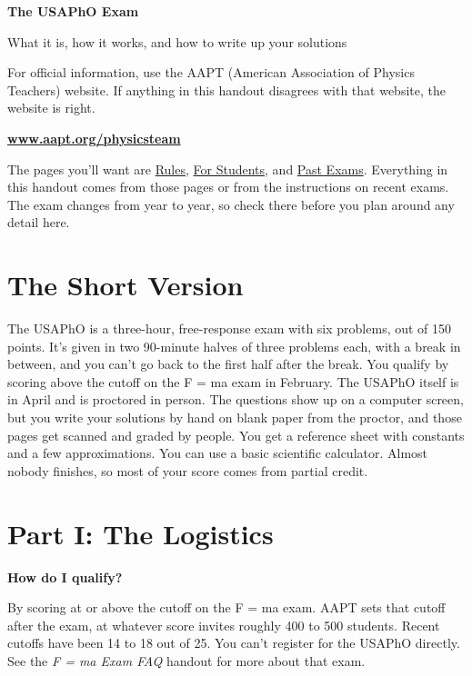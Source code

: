 \documentclass[11pt]{article}
\newcommand{\psettitle}[1]{
    \begin{center}
    \huge \textbf{#1}
    \end{center}
}
\newcommand{\Q}[1]{\par\medskip\noindent\textbf{\color{qblue}#1}\par\nobreak\vspace{1pt}\nobreak}
\begin{document}
\psettitle{The USAPhO Exam}
\begin{center}
\large What it is, how it works, and how to write up your solutions
\end{center}

\begin{official}
For official information, use the AAPT (American Association of Physics Teachers) website.
If anything in this handout disagrees with that website, the website is right.
\begin{center}
\large\bfseries
\href{https://www.aapt.org/physicsteam/}{www.aapt.org/physicsteam}
\end{center}
The pages you'll want are
\href{https://www.aapt.org/physicsteam/PT-rules.cfm}{Rules},
\href{https://www.aapt.org/physicsteam/PT-students.cfm}{For Students}, and
\href{https://www.aapt.org/Common2022/pastexams.cfm}{Past Exams}. Everything in this
handout comes from those pages or from the instructions on recent exams. The exam changes
from year to year, so check there before you plan around any detail here.
\end{official}

\section{The Short Version}

\begin{keybox}
The USAPhO is a three-hour, free-response exam with six problems, out of 150 points. It's
given in two 90-minute halves of three problems each, with a break in between, and you
can't go back to the first half after the break. You qualify by scoring above the cutoff on
the F = ma exam in February. The USAPhO itself is in April and is proctored in person. The
questions show up on a computer screen, but you write your solutions by hand on blank paper
from the proctor, and those pages get scanned and graded by people. You get a reference
sheet with constants and a few approximations. You can use a basic scientific calculator.
Almost nobody finishes, so most of your score comes from partial credit.
\end{keybox}

\section{Part I: The Logistics}

\Q{How do I qualify?}
By scoring at or above the cutoff on the F = ma exam. AAPT sets that cutoff after the exam,
at whatever score invites roughly 400 to 500 students. Recent cutoffs have been 14 to 18 out
of 25. You can't register for the USAPhO directly. See the \emph{F = ma Exam FAQ} handout
for more about that exam.
\end{document}
